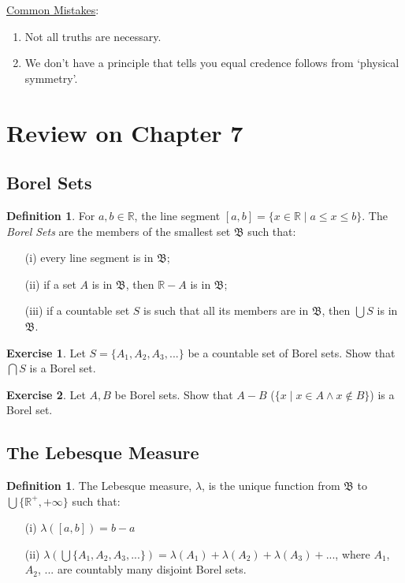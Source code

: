 \documentclass[12pt]{article}
\theoremstyle{definition}
\newtheorem{defin}[theo]{Definition}
\newtheorem{exer}{Exercise}
\begin{document}
\noindent
\underline{Common Mistakes}:
\begin{enumerate}
\item Not all truths are necessary.
\item We don't have a principle that tells you equal credence follows from `physical symmetry'.
\end{enumerate}

\section{Review on Chapter 7}

\subsection{Borel Sets}
\begin{defin}
For $a, b \in \mathbb{R}$, the line segment $[a,b] = \{x \in \mathbb{R} \; | \; a \leqslant x \leqslant b\}$. The \textit{Borel Sets} are the members of the smallest set $\mathfrak{B}$ such that:
\begin{enumerate}
\item[(i)] every line segment is in $\mathfrak{B}$;
\item[(ii)] if a set $A$ is in $\mathfrak{B}$, then $\mathbb{R} - A$ is in $\mathfrak{B}$;
\item[(iii)] if a countable set $S$ is such that all its members are in $\mathfrak{B}$, then $\bigcup S$ is in $\mathfrak{B}$.
\end{enumerate}
\end{defin}

\begin{exer}
Let $S = \{A_1, A_2, A_3, ...\}$ be a countable set of Borel sets. Show that $\bigcap S$ is a Borel set.
\end{exer}

\begin{exer}
Let $A, B$ be Borel sets. Show that $A - B$ ($\{x \; | \; x \in A \land x \notin B \}$) is a Borel set.
\end{exer}


\subsection{The Lebesque Measure}
\begin{defin}
The Lebesque measure, $\lambda$, is the unique function from $\mathfrak{B}$ to $\bigcup \{\mathbb{R}^+, +\infty\}$ such that:
\begin{enumerate}
\item[(i)] $\lambda([a, b])=b-a$
\item[(ii)] $\lambda(\bigcup\{A_1, A_2, A_3, ...\})=\lambda(A_1)+\lambda(A_2)+\lambda(A_3)+...$, where $A_1$, $A_2$, ... are countably many disjoint Borel sets.
\end{enumerate}
\end{defin}
\end{document}
